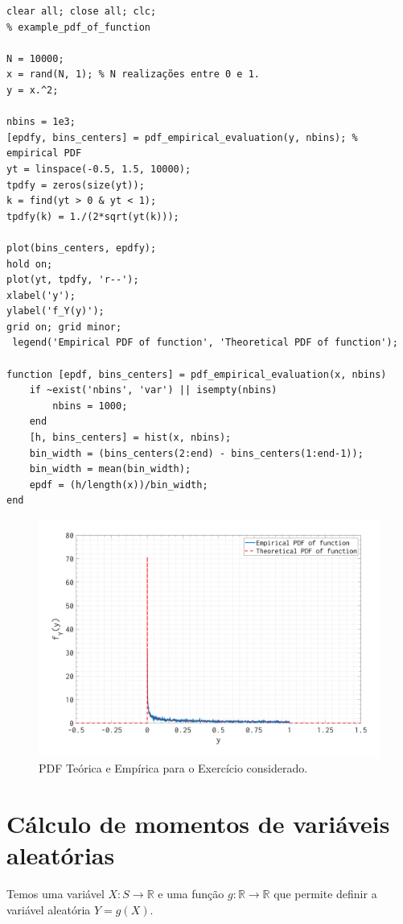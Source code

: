 \documentclass{article}
\newcommand{\bb}[1]{\mathbb{#1}}
\begin{document}
\begin{verbatim}
clear all; close all; clc;
% example_pdf_of_function

N = 10000;
x = rand(N, 1); % N realizações entre 0 e 1.
y = x.^2;

nbins = 1e3;
[epdfy, bins_centers] = pdf_empirical_evaluation(y, nbins); % empirical PDF
yt = linspace(-0.5, 1.5, 10000);
tpdfy = zeros(size(yt));
k = find(yt > 0 & yt < 1);
tpdfy(k) = 1./(2*sqrt(yt(k)));

plot(bins_centers, epdfy);
hold on;
plot(yt, tpdfy, 'r--');
xlabel('y');
ylabel('f_Y(y)');
grid on; grid minor;
 legend('Empirical PDF of function', 'Theoretical PDF of function');

function [epdf, bins_centers] = pdf_empirical_evaluation(x, nbins)
    if ~exist('nbins', 'var') || isempty(nbins)
        nbins = 1000;
    end
    [h, bins_centers] = hist(x, nbins);
    bin_width = (bins_centers(2:end) - bins_centers(1:end-1));
    bin_width = mean(bin_width);
    epdf = (h/length(x))/bin_width;
end
\end{verbatim}

\begin{figure}[h]
    \centering
    \includegraphics[scale=0.355]{figures/pdf_of_function.png}
    \caption{PDF Teórica e Empírica para o Exercício considerado.}
\end{figure}

\section{Cálculo de momentos de variáveis aleatórias}
Temos uma variável $X: S \rightarrow \bb{R}$ e uma função $g: \bb{R} \rightarrow \bb{R}$ que permite
definir a variável aleatória $Y = g(X)$.
\end{document}
